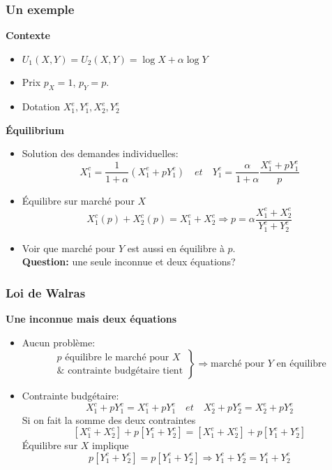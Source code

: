 \documentclass[handout]{beamer}
\newenvironment{iPar}[1]{\textbf{#1} \begin{itemize}}{\end{itemize}}
\newcommand{\mdp}{\medskip \pause}
\begin{document}
\begin{frame}\frametitle{Un exemple} \begin{iPar}{Contexte}\item $U_1(X,Y) =
U_2(X,Y) = \log X + \alpha \log Y$ \item Prix $p_X= 1$, $p_Y = p$.
\item Dotation $X_1^e, Y_1^e, X_2^e, Y_2^e$ \end{iPar} \mdp
\begin{iPar}{Équilibrium} \item Solution des demandes individuelles: $$X_1^c =
\frac{1}{1+\alpha}(X_1^e + p Y_1^e) \quad et \quad Y_1^c =
\frac{\alpha}{1+\alpha}\frac{X_1^e + p Y_1^e}{p} $$ \item Équilibre sur
marché pour $X$  \begin{equation*} X_1^c(p) + X_2^c(p) = X_1^e + X_2^e
\Rightarrow p = \alpha \frac{X_1^e + X_2^e}{Y_1^e + Y_2^e}
 \end{equation*} \item Voir que marché pour $Y$ est aussi en équilibre à $p$.\\\pause \textbf{Question:} une seule inconnue et deux équations?\end{iPar} \end{frame}

\begin{frame} \frametitle{Loi de Walras}

\begin{iPar}{Une inconnue mais deux équations} \item Aucun problème: $$\left.
\begin{array}{l} p \textrm{ équilibre le marché pour } X \\
\& \textrm{ contrainte budgétaire tient} \end{array}\right\}\Rightarrow
\textrm{marché pour } Y \textrm{ en équilibre}$$ \item Contrainte budgétaire: $$ X_1^c + p Y_1^c  =   X_1^e + p Y_1^e \quad et \quad
X_2^c + p Y_2^c  =   X_2^e + p Y_2^e$$ \pause Si on fait la somme des deux contraintes $$ [X_1^c + X_2^c] + p [Y_1^c + Y_2^c] = [X_1^e + X_2^e] + p
[Y_1^e + Y_2^e]$$ \pause Équilibre sur $X$  implique $$ p
[Y_1^c + Y_2^c]  = p [Y_1^e + Y_2^e] \Rightarrow  Y_1^c + Y_2^c = Y_1^e +
Y_2^e$$ \end{iPar}

\end{frame}
\end{document}
